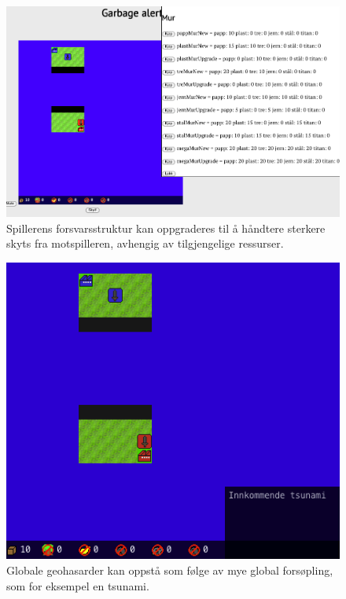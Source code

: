 \begin{center}
	\begin{figure}
		\includegraphics[width=\textwidth]{images/OppgradereMur.png}
		\caption{Spillerens forsvarsstruktur kan oppgraderes til å håndtere sterkere skyts fra motspilleren, avhengig av tilgjengelige ressurser.}
		\label{fig:OppgradereMur}
	\end{figure}
\end{center}

\begin{center}
	\begin{figure}
		\includegraphics[width=\textwidth]{images/Tsunami.png}
		\caption{Globale geohasarder kan oppstå som følge av mye global forsøpling, som for eksempel en tsunami.}
		\label{fig:Tsunami}
	\end{figure}
\end{center}

